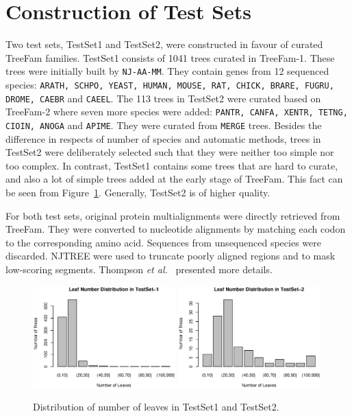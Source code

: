 \section{Construction of Test Sets}
Two test sets, {\sf TestSet1} and {\sf TestSet2}, were constructed in favour of curated TreeFam families.
{\sf TestSet1} consists of 1041 trees curated in TreeFam-1. These trees were initially built
by {\tt NJ-AA-MM}. They contain genes from 12 sequenced species:
{\tt ARATH, SCHPO, YEAST, HUMAN, MOUSE, RAT, CHICK, BRARE, FUGRU, DROME, CAEBR} and {\tt CAEEL}.
The 113 trees in {\sf TestSet2} were curated based on TreeFam-2 where seven more species were added:
{\tt PANTR, CANFA, XENTR, TETNG, CIOIN, ANOGA} and {\tt APIME}. They were curated from
{\tt MERGE} trees. Besides the difference in respects of number of species and automatic methods,
trees in {\sf TestSet2} were deliberately selected such that they were neither too simple
nor too complex. In contrast, {\sf TestSet1} contains some trees that are hard to curate,
and also a lot of simple trees added at the early stage of TreeFam. This fact can be seen from
Figure~\ref{fig:leaf-dist}. Generally, {\sf TestSet2} is of higher quality.

For both test sets, original protein multialignments were directly retrieved from TreeFam.
They were converted to nucleotide alignments by matching each codon to
the corresponding amino acid. Sequences from unsequenced species were discarded.
NJTREE were used to truncate poorly aligned regions and to mask low-scoring segments.
Thompson {\it et al.}~\cite{thompson97} presented more details.

\begin{figure}
\begin{center}
\includegraphics[width=0.49\textwidth]{leaf-ts1}
\includegraphics[width=0.49\textwidth]{leaf-ts2}
\end{center}
\caption{Distribution of number of leaves in {\sf TestSet1} and {\sf TestSet2}.}\label{fig:leaf-dist}
\end{figure}

